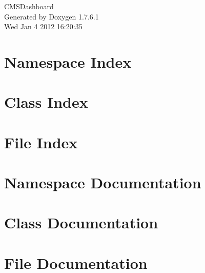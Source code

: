 \documentclass[a4paper]{book}
\begin{document}
\begin{titlepage}
\vspace*{7cm}
\begin{center}
{\Large \-C\-M\-S\-Dashboard }\\
\vspace*{1cm}
{\large \-Generated by Doxygen 1.7.6.1}\\
\vspace*{0.5cm}
{\small Wed Jan 4 2012 16:20:35}\\
\end{center}
\end{titlepage}
\clearemptydoublepage
{}
\tableofcontents
\clearemptydoublepage
{}
\chapter{\-Namespace \-Index}

\chapter{\-Class \-Index}

\chapter{\-File \-Index}

\chapter{\-Namespace \-Documentation}



\chapter{\-Class \-Documentation}








\chapter{\-File \-Documentation}






\printindex
\end{document}

